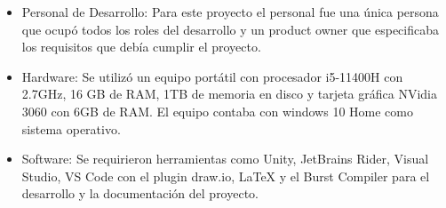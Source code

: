 \begin{itemize}
    \item Personal de Desarrollo: Para este proyecto el personal fue una única persona que ocupó todos los roles del desarrollo y un product owner que especificaba los requisitos que debía cumplir el proyecto.
    
    \item Hardware: Se utilizó un equipo portátil con procesador i5-11400H con 2.7GHz, 16 GB de RAM, 1TB de memoria en disco y tarjeta gráfica NVidia 3060 con 6GB de RAM. El equipo contaba con windows 10 Home como sistema operativo. 
    
    \item Software: Se requirieron herramientas como Unity, JetBrains Rider, Visual Studio, VS Code con el plugin draw.io, LaTeX y el Burst Compiler para el desarrollo y la documentación del proyecto.
\end{itemize}

